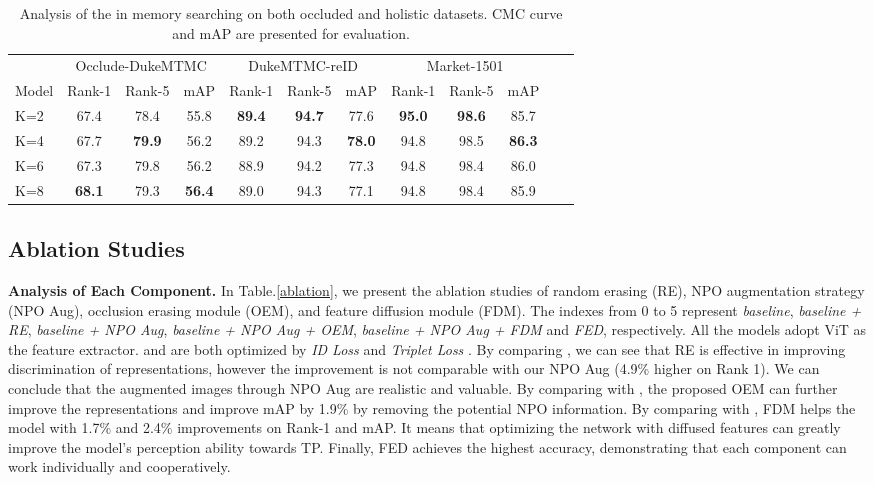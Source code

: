\documentclass[10pt,twocolumn,letterpaper]{article}
\begin{document}
\begin{table*}[t]
	\centering
	\small
	\begin{tabular}{cccccccccccc}
	    \toprule
		\multicolumn{1}{c}{} & \multicolumn{3}{c}{Occlude-DukeMTMC} & \multicolumn{3}{c}{DukeMTMC-reID} & \multicolumn{3}{c}{Market-1501} \\
		\multicolumn{1}{l}{Model} & Rank-1 & Rank-5 & mAP & Rank-1 & Rank-5 & mAP & Rank-1 & Rank-5 & mAP \\
		\hline
		\multicolumn{1}{l}{K=2} & 67.4 & 78.4 & 55.8 & \textbf{89.4} & \textbf{94.7} & 77.6 & \textbf{95.0} & \textbf{98.6} & 85.7\\
		\multicolumn{1}{l}{K=4} & 67.7 & \textbf{79.9} & 56.2 & 89.2 & 94.3 & \textbf{78.0} & 94.8 & 98.5 & \textbf{86.3}\\
		\multicolumn{1}{l}{K=6} & 67.3 & 79.8 & 56.2 & 88.9 & 94.2 &77.3 & 94.8 & 98.4 & 86.0\\
		\multicolumn{1}{l}{K=8} & \textbf{68.1} & 79.3 & \textbf{56.4} & 89.0 & 94.3 & 77.1 & 94.8 & 98.4 & 85.9\\
		\bottomrule
	\end{tabular}
	\caption{Analysis of the  in memory searching on both occluded and holistic datasets. CMC curve and mAP are presented for evaluation.
	}
	\label{memorysearch}
\end{table*}

\subsection{Ablation Studies}
\textbf{Analysis of Each Component.} 
In Table.\ref{ablation}, we present the ablation studies of random erasing (RE), NPO augmentation strategy (NPO Aug), occlusion erasing module (OEM), and feature diffusion module (FDM). The indexes from 0 to 5 represent \emph{baseline}, \emph{baseline + RE}, \emph{baseline + NPO Aug}, \emph{baseline + NPO Aug + OEM}, \emph{baseline + NPO Aug + FDM} and \emph{FED}, respectively. All the models adopt ViT as the feature extractor.  and  are both optimized by \emph{ID Loss} and \emph{Triplet Loss} \cite{hermans2017defense}. By comparing , we can see that RE \cite{zhong2020random} is effective in improving discrimination of representations, however the improvement is not comparable with our NPO Aug (4.9\% higher on Rank 1). We can conclude that the augmented images through NPO Aug are realistic and valuable. By comparing  with , the proposed OEM can further improve the representations and improve mAP by 1.9\% by removing the potential NPO information. By comparing  with , FDM helps the model with 1.7\% and 2.4\% improvements on Rank-1 and mAP. It means that optimizing the network with diffused features can greatly improve the model's perception ability towards TP. Finally, FED achieves the highest accuracy, demonstrating that each component can work individually and cooperatively.
\end{document}

